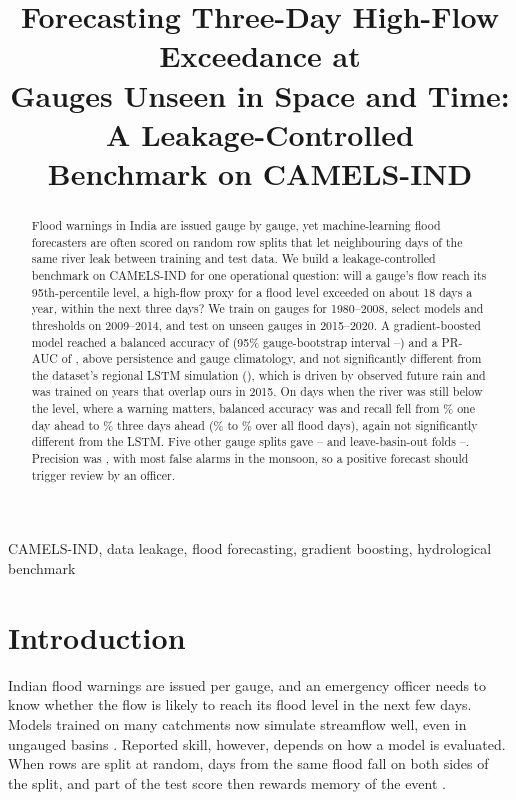 \documentclass[conference]{IEEEtran}
\begin{document}
\title{Forecasting Three-Day High-Flow Exceedance at\\
Gauges Unseen in Space and Time: A Leakage-Controlled\\
Benchmark on CAMELS-IND}

\author{
}

\maketitle

\begin{abstract}
Flood warnings in India are issued gauge by gauge, yet machine-learning flood forecasters are often scored on random row splits that let neighbouring days of the same river leak between training and test data. We build a leakage-controlled benchmark on CAMELS-IND for one operational question: will a gauge's flow reach its 95th-percentile level, a high-flow proxy for a flood level exceeded on about 18 days a year, within the next three days? We train on \NTrainGauges{} gauges for 1980--2008, select models and thresholds on 2009--2014, and test on \NTestGauges{} unseen gauges in 2015--2020. A gradient-boosted model reached a balanced accuracy of \XgbBA{} (95\% gauge-bootstrap interval \XgbBALo--\XgbBAHi) and a PR-AUC of \XgbPR, above persistence and gauge climatology, and not significantly different from the dataset's regional LSTM simulation (\LstmBA), which is driven by observed future rain and was trained on years that overlap ours in 2015. On days when the river was still below the level, where a warning matters, balanced accuracy was \OnXgbBA{} and recall fell from \LeadOneRise\% one day ahead to \LeadThreeRise\% three days ahead (\LeadOne\% to \LeadThree\% over all flood days), again not significantly different from the LSTM. \LeakAbstract{} Five other gauge splits gave \SplitBAMin--\SplitBAMax{} and leave-basin-out folds \BasinBAMin--\BasinBAMax. Precision was \XgbPrec, with most false alarms in the monsoon, so a positive forecast should trigger review by an officer.
\end{abstract}

\begin{IEEEkeywords}
CAMELS-IND, data leakage, flood forecasting, gradient boosting, hydrological benchmark
\end{IEEEkeywords}

\section{Introduction}
Indian flood warnings are issued per gauge, and an emergency officer needs to know whether the flow is likely to reach its flood level in the next few days. Models trained on many catchments now simulate streamflow well, even in ungauged basins \cite{Kratzert2019a,Kratzert2019b,Nearing2024}. Reported skill, however, depends on how a model is evaluated. When rows are split at random, days from the same flood fall on both sides of the split, and part of the test score then rewards memory of the event \cite{Kapoor2023,Roberts2017}.
\end{document}
